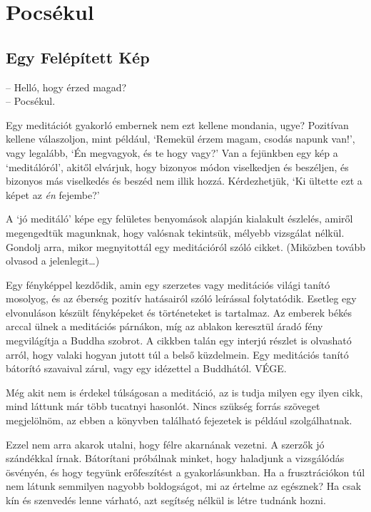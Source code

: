 \chapter{Pocsékul}

\section{Egy Felépített Kép}


\noindent -- Helló, hogy érzed magad?\\
-- Pocsékul.

Egy meditációt gyakorló embernek nem ezt kellene mondania, ugye?
Pozitívan kellene válaszoljon, mint például, `Remekül érzem magam,
csodás napunk van!', vagy legalább, `Én megvagyok, és te hogy vagy?' Van
a fejünkben egy kép a `meditálóról', akitől elvárjuk, hogy bizonyos
módon viselkedjen és beszéljen, és bizonyos más viselkedés és beszéd nem
illik hozzá. Kérdezhetjük, `Ki ültette ezt a képet az \emph{én}
fejembe?'

A `jó meditáló' képe egy felületes benyomások alapján kialakult
észlelés, amiről megengedtük magunknak, hogy valósnak tekintsük, mélyebb
vizsgálat nélkül. Gondolj arra, mikor megnyitottál egy meditációról
szóló cikket. (Miközben tovább olvasod a jelenlegit\ldots)

Egy fényképpel kezdődik, amin egy szerzetes vagy meditációs világi
tanító mosolyog, és az éberség pozitív hatásairól szóló leírással
folytatódik. Esetleg egy elvonuláson készült fényképeket és történeteket
is tartalmaz. Az emberek békés arccal ülnek a meditációs párnákon, míg
az ablakon keresztül áradó fény megvilágítja a Buddha szobrot. A cikkben
talán egy interjú részlet is olvasható arról, hogy valaki hogyan jutott
túl a belső küzdelmein. Egy meditációs tanító bátorító szavaival zárul,
vagy egy idézettel a Buddhától. VÉGE.

Még akit nem is érdekel túlságosan a meditáció, az is tudja milyen egy
ilyen cikk, mind láttunk már több tucatnyi hasonlót. Nincs szükség
forrás szöveget megjelölnöm, az ebben a könyvben található fejezetek is
például szolgálhatnak.

Ezzel nem arra akarok utalni, hogy félre akarnának vezetni. A szerzők jó
szándékkal írnak. Bátorítani próbálnak minket, hogy haladjunk a
vizsgálódás ösvényén, és hogy tegyünk erőfeszítést a gyakorlásunkban. Ha
a frusztrációkon túl nem látunk semmilyen nagyobb boldogságot, mi az
értelme az egésznek? Ha csak kín és szenvedés lenne várható, azt
segítség nélkül is létre tudnánk hozni.

